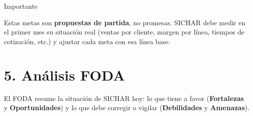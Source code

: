 \documentclass[11pt,a4paper]{article}
\begin{document}
\begin{cajaaviso}{Importante}

Estas metas son \textbf{propuestas de partida}, no promesas. SICHAR debe medir en el primer mes su
situación real (ventas por cliente, margen por línea, tiempos de cotización, etc.) y ajustar cada
meta con esa línea base.

\end{cajaaviso}

\hypertarget{anuxe1lisis-foda}{%
\section{5. Análisis FODA}\label{anuxe1lisis-foda}}

El FODA resume la situación de SICHAR hoy: lo que tiene a favor (\textbf{Fortalezas} y
\textbf{Oportunidades}) y lo que debe corregir o vigilar (\textbf{Debilidades} y \textbf{Amenazas}).
\end{document}
